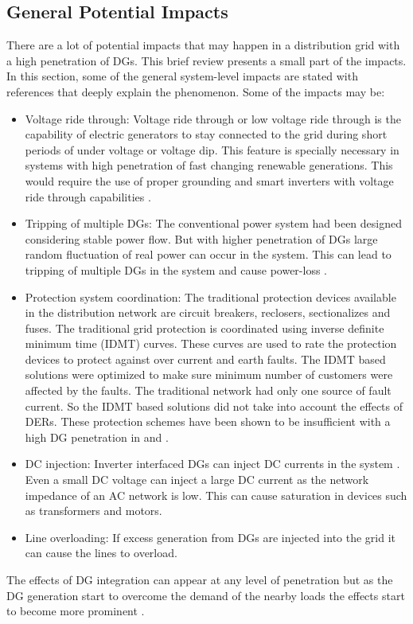 \subsection{General Potential Impacts}
There are a lot of potential impacts that may happen in a distribution grid with a high penetration of DGs. This brief review presents a small part of the impacts. In this section, some of the general system-level impacts are stated with references that deeply explain the phenomenon. Some of the impacts may be:
\begin{itemize}
    \item Voltage ride through: Voltage ride through or low voltage ride through is the capability of electric generators to stay connected to the grid during short periods of under voltage or voltage dip. This feature is specially necessary in systems with high penetration of fast changing renewable generations. This would require the use of proper grounding and smart inverters with voltage ride through capabilities \cite{GPI1}.   
    \item Tripping of multiple DGs: The conventional power system had been designed considering stable power flow. But with higher penetration of DGs large random fluctuation of real power can occur in the system. This can lead to tripping of multiple DGs in the system and cause power-loss \cite{GP2}.
    \item Protection system coordination: The traditional protection devices available in the distribution network are circuit breakers, reclosers, sectionalizes and fuses. The traditional grid protection is coordinated using inverse definite minimum time (IDMT) curves. These curves are used to rate the protection devices to protect against over current and earth faults. The IDMT based solutions were optimized to make sure minimum number of customers were affected by the faults. The traditional network had only one source of fault current. So the IDMT based solutions did not take into account the effects of DERs. These protection schemes have been shown to be insufficient with a high DG penetration in \cite{PR133} and \cite{PR134}.
    \item DC injection: Inverter interfaced DGs can inject DC currents in the system \cite{GP5}. Even a small DC voltage can inject a large DC current as the network impedance of an AC network is low. This can cause saturation in devices such as transformers and motors.
    \item Line overloading: If excess generation from DGs are injected into the grid it can cause the lines to overload. \cite{GP6}
\end{itemize}
The effects of DG integration can appear at any level of penetration but as the DG generation start to overcome the demand of the nearby loads the effects start to become more prominent \cite{Th_ali}.

